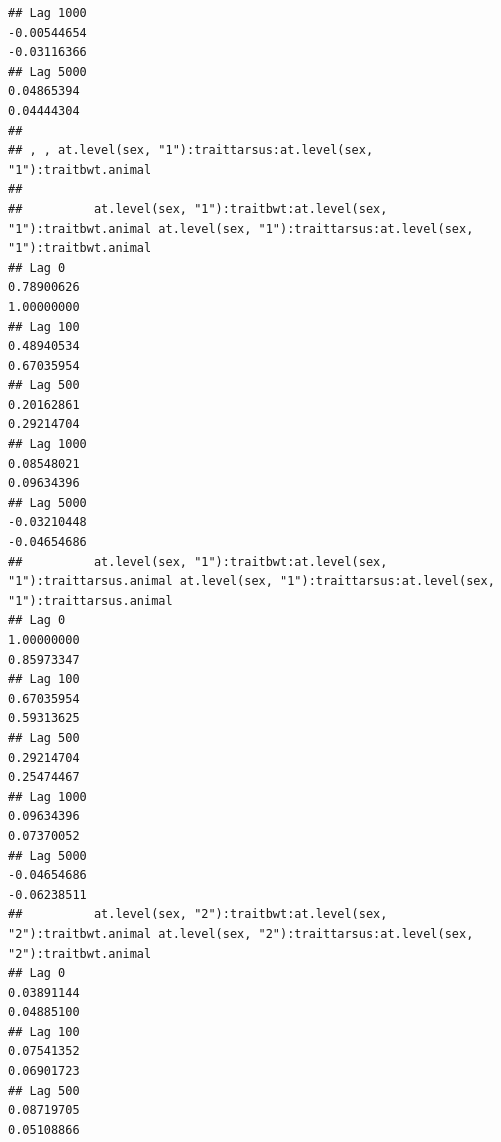 \documentclass[
  12pt,
]{book}
\begin{document}
\begin{verbatim}
## Lag 1000                                                      -0.00544654                                                         -0.03116366
## Lag 5000                                                       0.04865394                                                          0.04444304
## 
## , , at.level(sex, "1"):traittarsus:at.level(sex, "1"):traitbwt.animal
## 
##          at.level(sex, "1"):traitbwt:at.level(sex, "1"):traitbwt.animal at.level(sex, "1"):traittarsus:at.level(sex, "1"):traitbwt.animal
## Lag 0                                                        0.78900626                                                        1.00000000
## Lag 100                                                      0.48940534                                                        0.67035954
## Lag 500                                                      0.20162861                                                        0.29214704
## Lag 1000                                                     0.08548021                                                        0.09634396
## Lag 5000                                                    -0.03210448                                                       -0.04654686
##          at.level(sex, "1"):traitbwt:at.level(sex, "1"):traittarsus.animal at.level(sex, "1"):traittarsus:at.level(sex, "1"):traittarsus.animal
## Lag 0                                                           1.00000000                                                           0.85973347
## Lag 100                                                         0.67035954                                                           0.59313625
## Lag 500                                                         0.29214704                                                           0.25474467
## Lag 1000                                                        0.09634396                                                           0.07370052
## Lag 5000                                                       -0.04654686                                                          -0.06238511
##          at.level(sex, "2"):traitbwt:at.level(sex, "2"):traitbwt.animal at.level(sex, "2"):traittarsus:at.level(sex, "2"):traitbwt.animal
## Lag 0                                                        0.03891144                                                        0.04885100
## Lag 100                                                      0.07541352                                                        0.06901723
## Lag 500                                                      0.08719705                                                        0.05108866

\end{verbatim}
\end{document}
